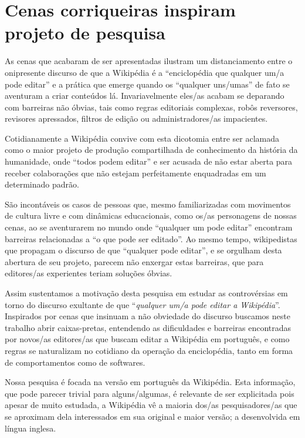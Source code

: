 \section{Cenas corriqueiras inspiram projeto de pesquisa}

As cenas que acabaram de ser apresentadas ilustram um distanciamento entre o onipresente discurso de que a Wikipédia é a ``enciclopédia que qualquer um/a pode editar'' e a prática que emerge quando os ``qualquer uns/umas'' de fato se aventuram a criar conteúdos lá. Invariavelmente eles/as acabam se deparando com barreiras não óbvias, tais como regras editoriais complexas, robôs reversores, revisores apressados, filtros de edição ou administradores/as impacientes.

Cotidianamente a Wikipédia convive com esta dicotomia entre ser aclamada como o maior projeto de produção compartilhada de conhecimento da história da humanidade, onde ``todos podem editar'' e ser acusada de não estar aberta para receber colaborações que não estejam perfeitamente enquadradas em um determinado padrão.

São incontáveis os casos de pessoas que, mesmo familiarizadas com movimentos de cultura livre e com dinâmicas educacionais, como os/as personagens de nossas cenas, ao se aventurarem no mundo onde ``qualquer um pode editar'' encontram barreiras relacionadas a ``o que pode ser editado''. Ao mesmo tempo, wikipedistas que propagam o discurso de que ``qualquer pode editar'', e se orgulham desta abertura de seu projeto, parecem não enxergar estas barreiras, que para editores/as experientes teriam soluções óbvias.

Assim sustentamos a motivação desta pesquisa em estudar as controvérsias em torno do discurso exultante de que ``\textit{qualquer um/a pode editar a Wikipédia}''. Inspirados por cenas que insinuam a não obviedade do discurso buscamos neste trabalho abrir caixas-pretas, entendendo as dificuldades e barreiras encontradas por novos/as editores/as que buscam editar a Wikipédia em português, e como regras se naturalizam no cotidiano da operação da enciclopédia, tanto em forma de comportamentos como de softwares.

Nossa pesquisa é focada na versão em português da Wikipédia. Esta informação, que pode parecer trivial para alguns/algumas, é relevante de ser explicitada pois apesar de muito estudada, a Wikipédia vê a maioria dos/as pesquisadores/as que se aproximam dela interessados em sua original e maior versão; a desenvolvida em língua inglesa. 

